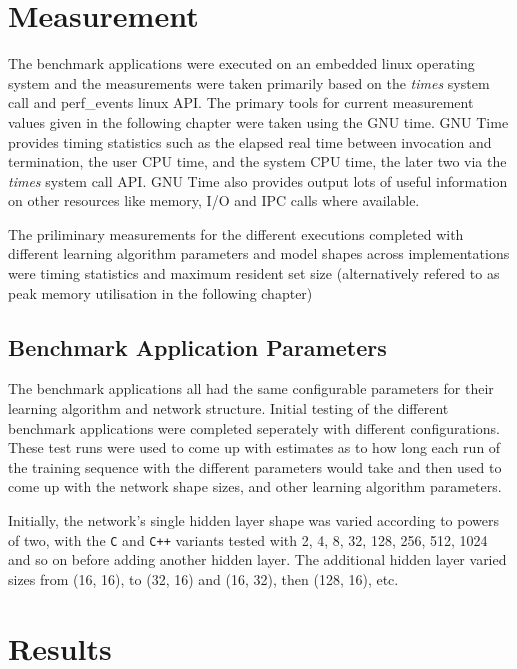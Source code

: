 \chapter{Measurement}

The benchmark applications were executed on an embedded linux operating system and the measurements were taken primarily based on the \textit{times} system call and perf\_events linux API. The primary tools for current measurement values given in the following chapter were taken using the GNU time. GNU Time provides timing statistics such as the elapsed real time between invocation and termination, the user CPU time, and the system CPU time, the later two via the \textit{times} system call API. GNU Time also provides output lots of useful information on other resources like memory, I/O and IPC calls where available.

The priliminary measurements for the different executions completed with different learning algorithm parameters and model shapes across implementations were timing statistics and maximum resident set size (alternatively refered to as peak memory utilisation in the following chapter)

\section{Benchmark Application Parameters}

The benchmark applications all had the same configurable parameters for their learning algorithm and network structure. Initial testing of the different benchmark applications were completed seperately with different configurations. These test runs were used to come up with estimates as to how long each run of the training sequence with the different parameters would take and then used to come up with the network shape sizes, and other learning algorithm parameters.

Initially, the network's single hidden layer shape was varied according to powers of two, with the \texttt{C} and \texttt{C++} variants tested with 2, 4, 8, 32, 128, 256, 512, 1024 and so on before adding another hidden layer. The additional hidden layer varied sizes from (16, 16), to (32, 16) and (16, 32), then (128, 16), etc.


\chapter{Results}

